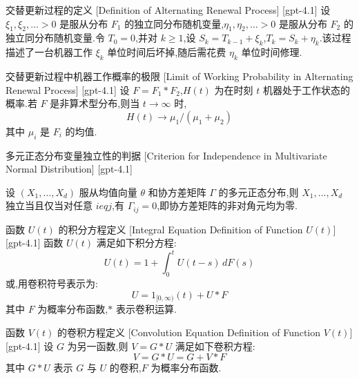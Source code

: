 \documentclass[UTF8]{ctexart}
\begin{document}
    
    
    \begin{dfn}
        {交替更新过程的定义}
        [Definition of Alternating Renewal Process]
        [gpt-4.1]
        设 $\xi_{1}, \xi_{2}, \dots > 0$ 是服从分布 $F_{1}$ 的独立同分布随机变量,$\eta_{1}, \eta_{2}, \ldots > 0$ 是服从分布 $F_{2}$ 的独立同分布随机变量.令 $T_{0} = 0$,并对 $k \geq 1$,设 $S_{k} = T_{k - 1} + \xi_{k}$,$T_{k} = S_{k} + \eta_{k}$.该过程描述了一台机器工作 $\xi_{k}$ 单位时间后坏掉,随后需花费 $\eta_{k}$ 单位时间修理.
    \end{dfn}
    
    
    
    \begin{thm}
        {交替更新过程中机器工作概率的极限}
        [Limit of Working Probability in Alternating Renewal Process]
        [gpt-4.1]
        设 $F = F_{1} * F_{2}$,$H(t)$ 为在时刻 $t$ 机器处于工作状态的概率.若 $F$ 是非算术型分布,则当 $t \to \infty$ 时,
\[
H(t) \to \mu_{1} / (\mu_{1} + \mu_{2})
\]
其中 $\mu_{i}$ 是 $F_{i}$ 的均值.
    \end{thm}
    
    
    
    \begin{thm}
        {多元正态分布变量独立性的判据}
        [Criterion for Independence in Multivariate Normal Distribution]
        [gpt-4.1]
        
设 $(X_1, \ldots, X_d)$ 服从均值向量 $\theta$ 和协方差矩阵 $\Gamma$ 的多元正态分布,则 $X_1, \ldots, X_d$ 独立当且仅当对任意 $i 
eq j$,有 $\Gamma_{ij} = 0$,即协方差矩阵的非对角元均为零.

    \end{thm}
    
    
    
    \begin{dfn}
        {函数 $U(t)$ 的积分方程定义}
        [Integral Equation Definition of Function $U(t)$]
        [gpt-4.1]
        函数 $U(t)$ 满足如下积分方程:
\[
U(t) = 1 + \int_0^t U(t-s)\,dF(s)
\]
或,用卷积符号表示为:
\[
U = 1_{[0,\infty)}(t) + U * F
\]
其中 $F$ 为概率分布函数,$*$ 表示卷积运算.
    \end{dfn}
    
    
    
    \begin{dfn}
        {函数 $V(t)$ 的卷积方程定义}
        [Convolution Equation Definition of Function $V(t)$]
        [gpt-4.1]
        设 $G$ 为另一函数,则 $V = G * U$ 满足如下卷积方程:
\[
V = G * U = G + V * F
\]
其中 $G * U$ 表示 $G$ 与 $U$ 的卷积,$F$ 为概率分布函数.
    \end{dfn}
    
\end{document}
